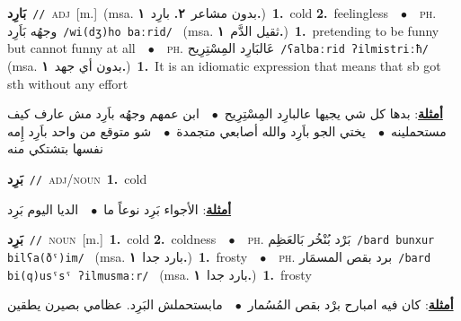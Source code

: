 \documentclass[10pt,a4paper,twoside]{article} %
\begin{document}
\begin{multicols}{2}
{\setlength\topsep{0pt}\textbf{\foreignlanguage{arabic}{بَارِد}}\ {\color{gray}\texttt{//}\color{black}}\ \textsc{adj}\ [m.]\ \color{gray}(msa. \foreignlanguage{arabic}{بدون مشاعر}~\foreignlanguage{arabic}{\textbf{٢.}}  \foreignlanguage{arabic}{بارِد}~\foreignlanguage{arabic}{\textbf{١.}})\color{black}\ \textbf{1.}~cold  \textbf{2.}~feelingless\ \ $\bullet$\ \ \textsc{ph.} \color{gray} \foreignlanguage{arabic}{وجهُه بَاَرِد}\color{black}\ {\color{gray}\texttt{/{\sffamily wi(dʒ)ho baːrid}/}\color{black}}\ \color{gray} (msa. \foreignlanguage{arabic}{ثقيل الدَّم}~\foreignlanguage{arabic}{\textbf{١.}})\color{black}\ \textbf{1.}~pretending to be funny but cannot funny at all\ \ $\bullet$\ \ \textsc{ph.} \color{gray} \foreignlanguage{arabic}{عَالبَارِد المِسْتِرِيح}\color{black}\ {\color{gray}\texttt{/{\sffamily ʕalbaːrid ʔilmistriːħ}/}\color{black}}\ \color{gray} (msa. \foreignlanguage{arabic}{بدون أي جهد}~\foreignlanguage{arabic}{\textbf{١.}})\color{black}\ \textbf{1.}~It is an idiomatic expression that means that sb got sth without any effort\  \begin{flushright}\color{gray}\foreignlanguage{arabic}{\textbf{\underline{\foreignlanguage{arabic}{أمثلة}}}: بدها كل شي يجيها عالبارِد المِسْتِرِيح\ $\bullet$\ \  ابن عمهم وجهُه باَرِد مش عارف كيف مستحملينه\ $\bullet$\ \  يختي الجو باَرِد والله أصابعي متجمدة\ $\bullet$\ \  شو متوقع من واحد باَرِد إِمه نفسها بتشتكي منه}\end{flushright}\color{black}} \vspace{2mm}

{\setlength\topsep{0pt}\textbf{\foreignlanguage{arabic}{بَرِد}}\ {\color{gray}\texttt{//}\color{black}}\ \textsc{adj/noun}\ \textbf{1.}~cold\  \begin{flushright}\color{gray}\foreignlanguage{arabic}{\textbf{\underline{\foreignlanguage{arabic}{أمثلة}}}: الأجواء بَرِد نوعاً ما\ $\bullet$\ \  الديا اليوم بَرِد}\end{flushright}\color{black}} \vspace{2mm}

{\setlength\topsep{0pt}\textbf{\foreignlanguage{arabic}{بَرِد}}\ {\color{gray}\texttt{//}\color{black}}\ \textsc{noun}\ [m.]\ \textbf{1.}~cold  \textbf{2.}~coldness\ \ $\bullet$\ \ \textsc{ph.} \color{gray} \foreignlanguage{arabic}{بَرْد بُنْخُر بَالعَظِم}\color{black}\ {\color{gray}\texttt{/{\sffamily bard bunxur bilʕa(ðˤ)im}/}\color{black}}\ \color{gray} (msa. \foreignlanguage{arabic}{بارد جدا}~\foreignlanguage{arabic}{\textbf{١.}})\color{black}\ \textbf{1.}~frosty\ \ $\bullet$\ \ \textsc{ph.} \color{gray} \foreignlanguage{arabic}{برد بقص المسمَار}\color{black}\ {\color{gray}\texttt{/{\sffamily bard bi(q)usˤsˤ ʔilmusmaːr}/}\color{black}}\ \color{gray} (msa. \foreignlanguage{arabic}{بارد جدا}~\foreignlanguage{arabic}{\textbf{١.}})\color{black}\ \textbf{1.}~frosty\  \begin{flushright}\color{gray}\foreignlanguage{arabic}{\textbf{\underline{\foreignlanguage{arabic}{أمثلة}}}: كان فيه امبارح برْد بقص المُسُمار\ $\bullet$\ \  مابستحملش البَرِد. عظامي بصيرن يطقين}\end{flushright}\color{black}} \vspace{2mm}


\end{multicols}
\end{document}
